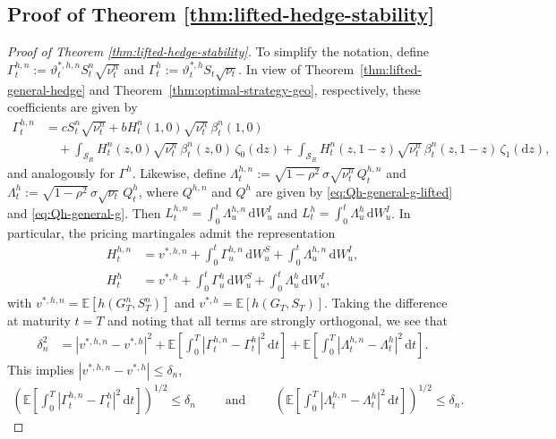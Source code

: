 \documentclass[10pt,a4paper,reqno]{amsart}
\theoremstyle{plain}
\theoremstyle{definition}
\theoremstyle{remark}
\theoremstyle{example}
\begin{document}
\subsection{Proof of Theorem \ref{thm:lifted-hedge-stability}}\label{sec:proof-lifted-hedge-stability}

\begin{proof}[Proof of Theorem \ref{thm:lifted-hedge-stability}]
To simplify the notation, define $\Gamma_t^{h,n} := \vartheta_t^{*,h,n} S_t^n\sqrt{\nu_t^n}$ and $\Gamma_t^h := \vartheta_t^{*,h} S_t\sqrt{\nu_t}$. In view of Theorem~\ref{thm:lifted-general-hedge} and Theorem~\ref{thm:optimal-strategy-geo}, respectively, these coefficients are given by
\begin{align}
    \Gamma_t^{h,n} &= cS_t^n\sqrt{\nu_t^n} + bH_t^n(1,0)\sqrt{\nu_t^n}\, \beta_t^n(1,0) 
    \nonumber\\ &\quad + \int_{\mathcal S_R} H_t^n(z,0)\sqrt{\nu_t^n}\, \beta_t^n(z,0)\, \zeta_0(\mathrm dz) + \int_{\mathcal S_R} H_t^n(z,1-z)\sqrt{\nu_t^n}\,\beta_t^n(z,1-z)\, \zeta_1(\mathrm dz), \label{eq:Gamma-lifted}
\end{align}
and analogously for $\Gamma^h$. Likewise, define $\Lambda_t^{h,n} := \sqrt{1-\rho^2}\,\sigma \sqrt{\nu_t^n}\,Q_t^{h,n}$ and $\Lambda_t^h := \sqrt{1-\rho^2}\,\sigma \sqrt{\nu_t}\,Q_t^h$, where $Q^{h,n}$ and $Q^h$ are given by \eqref{eq:Qh-general-g-lifted} and \eqref{eq:Qh-general-g}. Then $L_t^{h,n} = \int_0^t \Lambda_u^{h,n}\, \mathrm dW_u^I$ and $L_t^h = \int_0^t \Lambda_u^h\, \mathrm dW_u^I$. In particular, the pricing martingales admit the representation
\begin{align*}
    H_t^{h,n} &= v^{*,h,n} + \int_0^t \Gamma_u^{h,n}\, \mathrm dW_u^S + \int_0^t \Lambda_u^{h,n}\, \mathrm dW_u^I,
    \\ H_t^h &= v^{*,h} + \int_0^t \Gamma_u^h\, \mathrm dW_u^S + \int_0^t \Lambda_u^h\,\mathrm dW_u^I,
\end{align*}
with $v^{*,h,n} = \mathbb E[h(G_T^n, S_T^n)]$ and $v^{*,h} = \mathbb E[h(G_T, S_T)]$. Taking the difference at maturity $t = T$ and noting that all terms are strongly orthogonal, we see that 
\begin{align*}
    \delta_n^2 &= |v^{*,h,n}-v^{*,h}|^2 + \mathbb E\left[ \int_0^T |\Gamma_t^{h,n}-\Gamma_t^h|^2 \,\mathrm dt \right] + \mathbb E\left[ \int_0^T |\Lambda_t^{h,n}-\Lambda_t^h|^2 \,\mathrm dt \right].
\end{align*}
This implies $|v^{*,h,n}-v^{*,h}| \leq \delta_n$, 
\begin{align}
    \left( \mathbb E\left[ \int_0^T |\Gamma_t^{h,n}-\Gamma_t^h|^2 \,\mathrm dt \right] \right)^{1/2} \leq \delta_n \qquad \text{ and } \qquad \left( \mathbb E\left[ \int_0^T |\Lambda_t^{h,n}-\Lambda_t^h|^2 \,\mathrm dt \right] \right)^{1/2} \leq \delta_n.

\end{align}
\end{proof}
\end{document}
